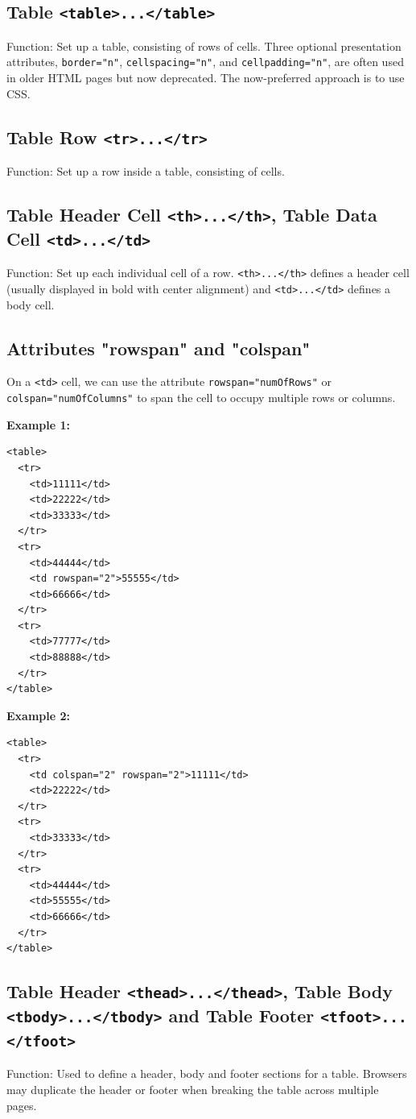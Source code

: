 \documentclass[12pt,a4paper]{article}
\begin{document}
\subsection*{Table \texttt{<table>...</table>}}
Function: Set up a table, consisting of rows of cells. Three optional presentation attributes, \texttt{border="n"}, \texttt{cellspacing="n"}, and \texttt{cellpadding="n"}, are often used in older HTML pages but now deprecated. The now-preferred approach is to use CSS.

\subsection*{Table Row \texttt{<tr>...</tr>}}
Function: Set up a row inside a table, consisting of cells.

\subsection*{Table Header Cell \texttt{<th>...</th>}, Table Data Cell \texttt{<td>...</td>}}
Function: Set up each individual cell of a row. \texttt{<th>...</th>} defines a header cell (usually displayed in bold with center alignment) and \texttt{<td>...</td>} defines a body cell.

\subsection*{Attributes "rowspan" and "colspan"}
On a \texttt{<td>} cell, we can use the attribute \texttt{rowspan="numOfRows"} or \texttt{colspan="numOfColumns"} to span the cell to occupy multiple rows or columns.

\textbf{Example 1:}
\begin{verbatim}
<table>
  <tr>
    <td>11111</td>
    <td>22222</td>
    <td>33333</td>
  </tr>
  <tr>
    <td>44444</td>
    <td rowspan="2">55555</td>
    <td>66666</td>
  </tr>
  <tr>
    <td>77777</td>
    <td>88888</td>
  </tr>
</table>
\end{verbatim}

\textbf{Example 2:}
\begin{verbatim}
<table>
  <tr>
    <td colspan="2" rowspan="2">11111</td>
    <td>22222</td>
  </tr>
  <tr>
    <td>33333</td>
  </tr>
  <tr>
    <td>44444</td>
    <td>55555</td>
    <td>66666</td>
  </tr>
</table>
\end{verbatim}

\subsection*{Table Header \texttt{<thead>...</thead>}, Table Body \texttt{<tbody>...</tbody>} and Table Footer \texttt{<tfoot>...</tfoot>}}
Function: Used to define a header, body and footer sections for a table. Browsers may duplicate the header or footer when breaking the table across multiple pages.
\end{document}
